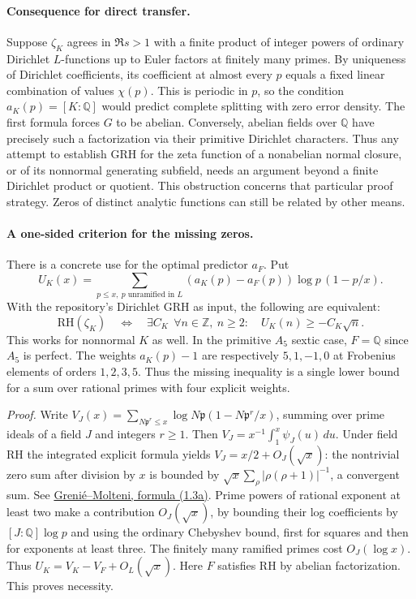 \paragraph{Consequence for direct transfer.}
Suppose $\zeta_K$ agrees in $\Re s>1$ with a finite product of integer powers
of ordinary Dirichlet $L$-functions up to Euler factors at finitely many primes.
By uniqueness of Dirichlet coefficients, its coefficient at almost every $p$
equals a fixed linear combination of values $\chi(p)$. This is periodic in $p$,
so the condition $a_K(p)=[K:\mathbb Q]$ would predict complete splitting
with zero error density. The first formula forces $G$ to be abelian.
Conversely, abelian fields over $\mathbb Q$ have precisely such a
factorization via their primitive Dirichlet characters. Thus any attempt
to establish GRH for the zeta function of a nonabelian normal closure,
or of its nonnormal generating subfield, needs an argument beyond a
finite Dirichlet product or quotient. This obstruction concerns that
particular proof strategy. Zeros of distinct analytic functions can still
be related by other means.

\paragraph{A one-sided criterion for the missing zeros.}
There is a concrete use for the optimal predictor $a_F$. Put
\[
 U_K(x)=\sum_{p\le x,\ p\text{ unramified in }L}
       (a_K(p)-a_F(p))\log p\,(1-p/x).
\]
With the repository's Dirichlet GRH as input, the following are equivalent:
\[
 \mathrm{RH}(\zeta_K)
 \quad\Longleftrightarrow\quad
 \exists C_K\ \ \forall n\in\mathbb Z,\ n\ge2:\quad
 U_K(n)\ge-C_K\sqrt n .
\]
This works for nonnormal $K$ as well. In the primitive $A_5$ sextic
case, $F=\mathbb Q$ since $A_5$ is perfect. The weights $a_K(p)-1$
are respectively $5,1,-1,0$ at Frobenius elements of orders
$1,2,3,5$. Thus the missing inequality is a single lower bound for a
sum over rational primes with four explicit weights.

\emph{Proof.} Write $V_J(x)=\sum_{N\mathfrak p^r\le x}\log N\mathfrak p
(1-N\mathfrak p^r/x)$, summing over prime ideals of a field $J$ and
integers $r\ge1$. Then $V_J=x^{-1}\int_1^x\psi_J(u)\,du$. Under field RH
the integrated explicit formula yields $V_J=x/2+O_J(\sqrt x)$: the
nontrivial zero sum after division by $x$ is bounded by
$\sqrt{x}\sum_\rho |\rho(\rho+1)|^{-1}$, a convergent sum.
See \href{https://arxiv.org/abs/1312.4465}{Greni\'e--Molteni,
formula (1.3a)}. Prime powers of rational exponent at least two
make a contribution $O_J(\sqrt x)$, by bounding their log coefficients
by $[J:\mathbb Q]\log p$ and using the ordinary Chebyshev bound,
first for squares and then for exponents at least three. The finitely many
ramified primes cost $O_J(\log x)$. Thus $U_K=V_K-V_F+O_L(\sqrt x)$.
Here $F$ satisfies RH by abelian factorization. This proves necessity.

